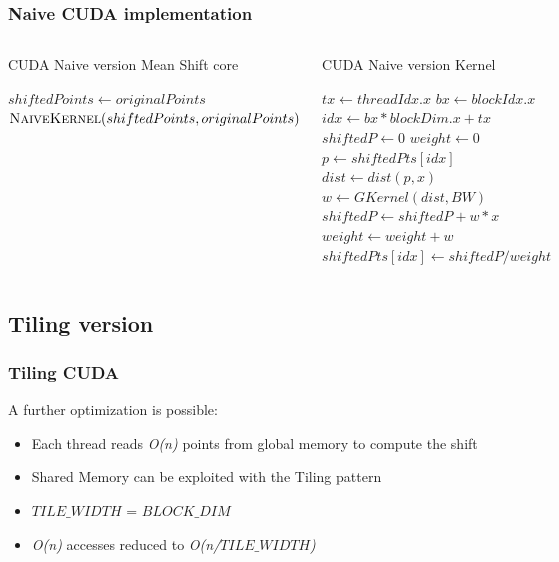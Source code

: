 \documentclass[xcolor=table]{beamer}
\begin{document}
\begin{frame}
\frametitle{Naive CUDA implementation}
\begin{columns}

\tiny{
\begin{algorithm}[H]
\tiny
\caption{CUDA Naive version Mean Shift core}
\label{NaiveCUDAMeanShiftAlg}
\begin{algorithmic}
	\State$shiftedPoints \gets originalPoints$
    		\State $\Call{NaiveKernel}{shiftedPoints, originalPoints}$
    \EndWhile
\EndFunction
\end{algorithmic}
\end{algorithm}
}


\begin{algorithm}[H]
\tiny
\caption{CUDA Naive version Kernel}
\label{NaiveCUDAKernelAlg}
\begin{algorithmic}
	\State $tx \gets threadIdx.x$
	\State $bx \gets blockIdx.x$
	\State $idx \gets bx * blockDim.x + tx$
	\State $shiftedP \gets 0$
	\State $weight \gets 0$
	\State $p \gets shiftedPts[idx]$
    		\State$dist \gets dist(p, x)$
    		\State $w \gets GKernel(dist, BW)$
    		\State $shiftedP\gets shiftedP + w*x$
    		\State $weight \gets weight + w$
    \EndFor
    \State $shiftedPts[idx] \gets shiftedP/weight$
    \EndIf
\EndFunction
\end{algorithmic}
\end{algorithm}

\end{columns}

\end{frame}


\subsection{Tiling version}

\begin{frame}
\frametitle{Tiling CUDA}
A further optimization is possible:
\vspace{0.45cm}
\begin{itemize}
\item Each thread reads \emph{O(n)} points from global memory to compute the shift
\vspace{0.25cm}
\item Shared Memory can be exploited with the Tiling pattern
\vspace{0.25cm}
\item $TILE\_WIDTH$ = $BLOCK\_DIM$
\vspace{0.25cm}
\item \emph{O(n)} accesses reduced to \emph{O(n/$TILE\_WIDTH$)}
\end{itemize}
\end{frame}
\end{document}
